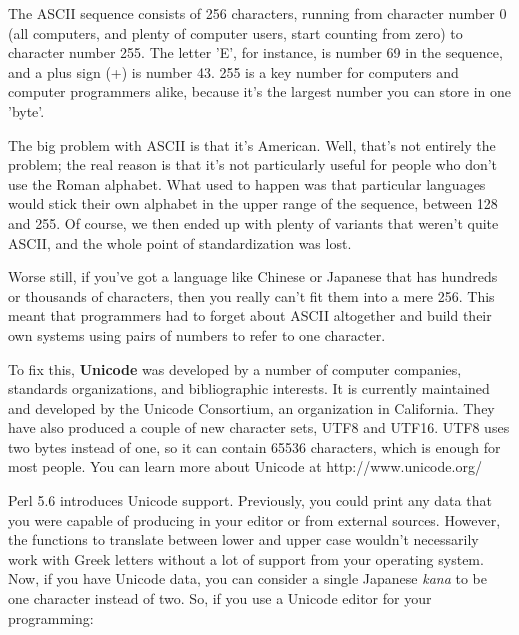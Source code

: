 \documentclass[a4paper,11pt]{book}
\begin{document}
\noindent 

\noindent The ASCII sequence consists of 256 characters, running from character number 0 (all computers, and plenty of computer users, start counting from zero) to character number 255. The letter 'E', for instance, is number 69 in the sequence, and a plus sign (+) is number 43. 255 is a key number for computers and computer programmers alike, because it's the largest number you can store in one 'byte'.

\noindent 

\noindent The big problem with ASCII is that it's American. Well, that's not entirely the problem; the real reason is that it's not particularly useful for people who don't use the Roman alphabet. What used to happen was that particular languages would stick their own alphabet in the upper range of the sequence, between 128 and 255. Of course, we then ended up with plenty of variants that weren't quite ASCII, and the whole point of standardization was lost.

\noindent 

\noindent Worse still, if you've got a language like Chinese or Japanese that has hundreds or thousands of characters, then you really can't fit them into a mere 256. This meant that programmers had to forget about ASCII altogether and build their own systems using pairs of numbers to refer to one character.

\noindent 

\noindent To fix this, \textbf{Unicode }was developed by a number of computer companies, standards organizations, and bibliographic interests. It is currently maintained and developed by the Unicode Consortium, an organization in California. They have also produced a couple of new character sets, UTF8 and UTF16. UTF8 uses two bytes instead of one, so it can contain 65536 characters, which is enough for most people. You can learn more about Unicode at http://www.unicode.org/

\noindent 

\noindent Perl 5.6 introduces Unicode support. Previously, you could print any data that you were capable of producing in your editor or from external sources. However, the functions to translate between lower and upper case wouldn't necessarily work with Greek letters without a lot of support from your operating system. Now, if you have Unicode data, you can consider a single Japanese \textit{kana }to be one character instead of two. So, if you use a Unicode editor for your programming:
\end{document}
